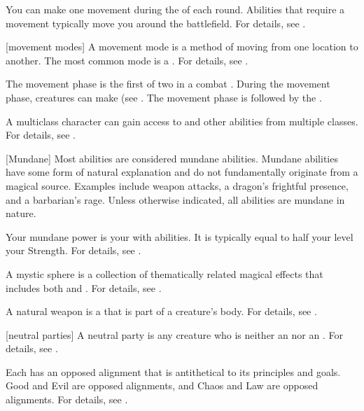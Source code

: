  You can make one movement during the  of each round.
Abilities that require a movement typically move you around the battlefield.
For details, see .

[movement modes] A movement mode is a method of moving from one location to another.
The most common mode is a .
For details, see .

 The movement phase is the first of two  in a combat .
During the movement phase, creatures can make  (see .
The movement phase is followed by the .

 A multiclass character can gain access to  and other abilities from multiple classes.
For details, see .

[Mundane] Most abilities are considered mundane abilities.
Mundane abilities have some form of natural explanation and do not fundamentally originate from a magical source.
Examples include weapon attacks, a dragon's frightful presence, and a barbarian's rage.
Unless otherwise indicated, all abilities are mundane in nature.

 Your mundane power is your  with  abilities.
It is typically equal to half your level \add your Strength.
For details, see .

 A mystic sphere is a collection of thematically related magical effects that includes both  and .
For details, see .

 A natural weapon is a  that is part of a creature's body.
For details, see .

[neutral parties] A neutral party is any creature who is neither an  nor an .
For details, see .

 Each  has an opposed alignment that is antithetical to its principles and goals.
Good and Evil are opposed alignments, and Chaos and Law are opposed alignments.
For details, see .

